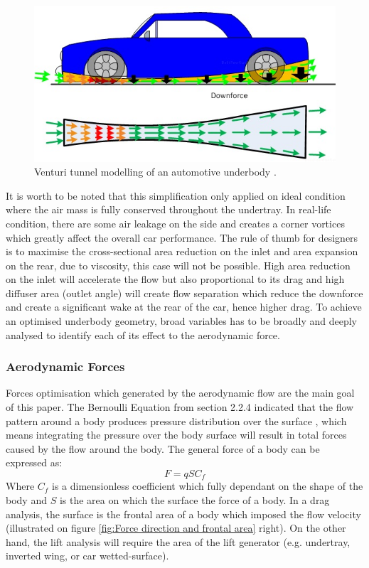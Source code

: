 \begin{figure}[!ht]
    \centering
    \includegraphics[scale=0.8]{Figures/venturi_tunnel.jpg}
    \caption{Venturi tunnel modelling of an automotive underbody \cite{Anonymous2020RaceDesign}.}
    \label{fig:venturi_tunnel_car}
\end{figure}
\noindent It is worth to be noted that this simplification only applied on ideal condition where the air mass is fully conserved throughout the undertray. In real-life condition, there are some air leakage on the side and creates a corner vortices which greatly affect the overall car performance. The rule of thumb for designers is to maximise the cross-sectional area reduction on the inlet and area expansion on the rear, due to viscosity, this case will not be possible. High area reduction on the inlet will accelerate the flow but also proportional to its drag and high diffuser area (outlet angle) will create flow separation which reduce the downforce and create a significant wake at the rear of the car, hence higher drag. To achieve an optimised underbody geometry, broad variables has to be broadly and deeply analysed to identify each of its effect to the aerodynamic force.


\subsubsection{Aerodynamic Forces}
Forces optimisation which generated by the aerodynamic flow are the main goal of this paper. The Bernoulli Equation from section 2.2.4 indicated that the flow pattern around a body produces pressure distribution over the surface \cite{Scibor-Rylski1984RoadAerodynamics}, which means integrating the pressure over the body surface will result in total forces caused by the flow around the body. The general force of a body can be expressed as:
\begin{equation}
    F = qSC_f
\end{equation}
Where $C_f$ is a dimensionless coefficient which fully dependant on the shape of the body \cite{Scibor-Rylski1984RoadAerodynamics} and $S$ is the area on which the surface the force of a body. In a drag analysis, the surface is the frontal area of a body which imposed the flow velocity (illustrated on figure \ref{fig:Force direction and frontal area} right). On the other hand, the lift analysis will require the area of the lift generator (e.g. undertray, inverted wing, or car wetted-surface).

